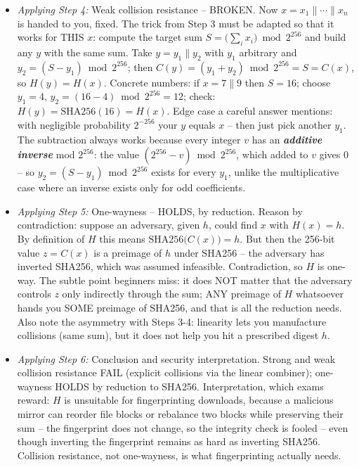 \documentclass[12pt, a4paper]{article}
\newcommand{\term}[1]{\textbf{\textit{#1}}}        %
\begin{document}
\begin{itemize}
    \item \textit{Applying Step 4:} Weak collision resistance -- BROKEN. Now $x = x_1 \| \cdots \| x_n$ is handed to you, fixed. The trick from Step 3 must be adapted so that it works for THIS $x$: compute the target sum $S = \big(\sum_i x_i\big) \bmod 2^{256}$ and build any $y$ with the same sum. Take $y = y_1 \| y_2$ with $y_1$ arbitrary and $y_2 = (S - y_1) \bmod 2^{256}$; then $C(y) = (y_1 + y_2) \bmod 2^{256} = S = C(x)$, so $H(y) = H(x)$. Concrete numbers: if $x = 7 \| 9$ then $S = 16$; choose $y_1 = 4$, $y_2 = (16 - 4) \bmod 2^{256} = 12$; check: $H(y) = \mathrm{SHA256}(16) = H(x)$. Edge case a careful answer mentions: with negligible probability $2^{-256}$ your $y$ equals $x$ -- then just pick another $y_1$. The subtraction always works because every integer $v$ has an \term{additive inverse} mod $2^{256}$: the value $(2^{256} - v) \bmod 2^{256}$, which added to $v$ gives $0$ -- so $y_2 = (S - y_1) \bmod 2^{256}$ exists for every $y_1$, unlike the multiplicative case where an inverse exists only for odd coefficients.
    \item \textit{Applying Step 5:} One-wayness -- HOLDS, by reduction. Reason by contradiction: suppose an adversary, given $h$, could find $x$ with $H(x) = h$. By definition of $H$ this means $\mathrm{SHA256}\big(C(x)\big) = h$. But then the 256-bit value $z = C(x)$ is a preimage of $h$ under SHA256 -- the adversary has inverted SHA256, which was assumed infeasible. Contradiction, so $H$ is one-way. The subtle point beginners miss: it does NOT matter that the adversary controls $z$ only indirectly through the sum; ANY preimage of $H$ whatsoever hands you SOME preimage of SHA256, and that is all the reduction needs. Also note the asymmetry with Steps 3-4: linearity lets you manufacture collisions (same sum), but it does not help you hit a prescribed digest $h$.
    \item \textit{Applying Step 6:} Conclusion and security interpretation. Strong and weak collision resistance FAIL (explicit collisions via the linear combiner); one-wayness HOLDS by reduction to SHA256. Interpretation, which exams reward: $H$ is unsuitable for fingerprinting downloads, because a malicious mirror can reorder file blocks or rebalance two blocks while preserving their sum -- the fingerprint does not change, so the integrity check is fooled -- even though inverting the fingerprint remains as hard as inverting SHA256. Collision resistance, not one-wayness, is what fingerprinting actually needs.
\end{itemize}
\end{document}
